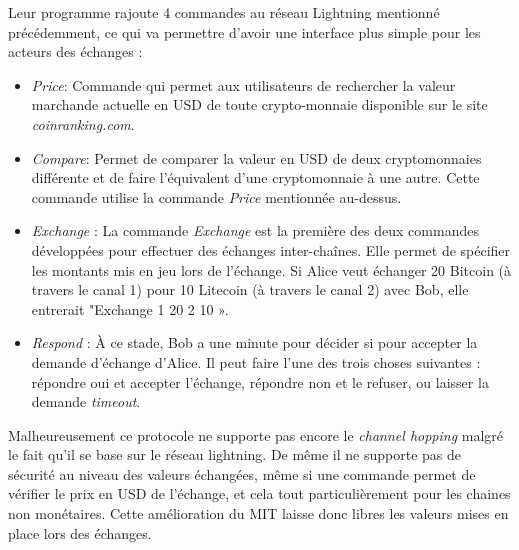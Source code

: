 Leur programme rajoute 4 commandes au réseau Lightning mentionné précédemment, ce qui va permettre d'avoir une interface plus simple pour les acteurs des échanges :
\begin{itemize}
    \item \textit{Price}: Commande qui permet aux utilisateurs de rechercher la valeur marchande actuelle en USD de toute crypto-monnaie disponible sur le site \textit{coinranking.com}.\\
    \item \textit{Compare}: Permet de comparer la valeur en USD de deux cryptomonnaies différente et de faire l'équivalent d'une cryptomonnaie à une autre. Cette commande utilise la commande \textit{Price} mentionnée au-dessus.\\
    \item \textit{Exchange} : La commande \textit{Exchange} est la première des deux commandes développées pour effectuer des échanges inter-chaînes. Elle permet de spécifier les montants mis en jeu lors de l'échange. Si Alice veut échanger 20 Bitcoin (à travers le canal 1) pour 10 Litecoin (à travers le canal 2) avec Bob, elle entrerait "Exchange 1 20 2 10 ».\\
    \item \textit{Respond} : À ce stade, Bob a une minute pour décider si pour accepter la demande d'échange d'Alice. Il peut faire l'une des trois choses suivantes : répondre oui et accepter l'échange, répondre non et le refuser, ou laisser la demande \textit{timeout}.\\
\end{itemize}


Malheureusement ce protocole ne supporte pas encore le \textit{channel hopping} malgré le fait qu'il se base sur le réseau lightning. 
De même il ne supporte pas de sécurité au niveau des valeurs échangées, même si une commande permet de vérifier le prix en USD de l'échange, et cela tout particulièrement pour les chaines non monétaires.
Cette amélioration du MIT laisse donc libres les valeurs mises en place lors des échanges. 

